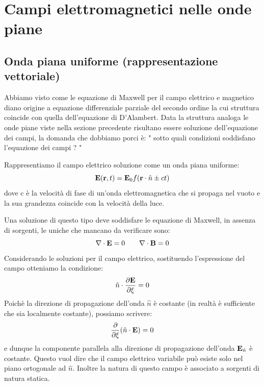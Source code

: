 \section{Campi elettromagnetici nelle onde piane}
\subsection{Onda piana uniforme (rappresentazione vettoriale)}

Abbiamo visto come le equazione di Maxwell per il campo elettrico e magnetico diano origine a equazione differenziale parziale del secondo ordine la cui struttura coincide con quella dell'equazione di D'Alambert. Data la struttura analoga le onde piane viste nella sezione precedente risultano essere soluzione dell'equazione dei campi, la domanda che dobbiamo porci \`e: " sotto quali condizioni soddisfano l'equazione dei campi ? "

Rappresentiamo il campo elettrico soluzione come un onda piana uniforme:
\begin{equation}
	\bold{E}(\bold{r},t) = \bold{E}_0 f(\bold{r} \cdot \hat{n} \pm ct)
\end{equation} 
dove c \`e la velocit\`a di fase di un'onda elettromagnetica che si propaga nel vuoto e la sua grandezza coincide con la velocit\`a della luce.

Una soluzione di questo tipo deve soddisfare le equazione di Maxwell, in assenza di sorgenti, le uniche che mancano da verificare sono:
\begin{equation*}
	\nabla \cdot \bold{E} = 0 \quad \quad \nabla \cdot \bold{B} = 0
\end{equation*}
Considerando le soluzioni per il campo elettrico, sostituendo l'espressione del campo otteniamo la condizione:
\begin{equation*}
	\hat{n} \cdot \frac{\partial \bold{E}}{\partial \xi} = 0
\end{equation*}
Poich\`e la direzione di propagazione dell'onda $\hat{n}$ \`e costante (in realt\`a \`e sufficiente che sia localmente costante), possiamo scrivere:
\begin{equation*}
	\frac{\partial}{\partial \xi}(\hat{n} \cdot \bold{E}) = 0
\end{equation*}
e dunque la componente parallela alla direzione di propagazione dell'onda $\bold{E}_{\hat{n}} $ \`e costante. Questo vuol dire che il campo elettrico variabile pu\`o esiste solo nel piano ortogonale ad $\hat{n}$. Inoltre la natura di questo campo \`e associato a sorgenti di natura statica.

